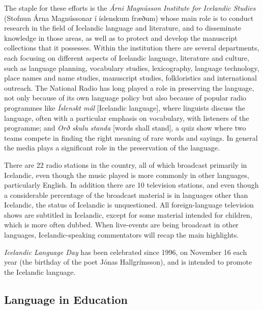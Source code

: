\documentclass{../../metanetpaper}
\begin{document}
\begin{multicols}{2}
The staple for these efforts is the \textit{Árni Magnússon Institute for Icelandic Studies} (Stofnun Árna Magnússonar í íslenskum fræðum) whose main role is to conduct research in the field of Icelandic language and literature, and to disseminate knowledge in those areas, as well as to protect and develop the manuscript collections that it possesses\cite{alt2}.  Within the institution there are several departments, each focusing on different aspects of Icelandic language, literature and culture, such as language planning, vocabulary studies, lexicography, language technology, place names and name studies, manuscript studies, folkloristics and international outreach.
The National Radio has long played a role in preserving the language, not only because of its own language policy but also because of popular radio programmes like \textit{Íslenskt mál} {[}Icelandic language{]}, where linguists discuss the language, often with a particular emphasis on vocabulary, with listeners of the programme; and \textit{Orð skulu standa} {[}words shall stand{]}, a quiz show where two teams compete in finding the right meaning of rare words and sayings. In general the media plays a significant role in the preservation of the language.

There are 22 radio stations in the country, all of which broadcast primarily in Icelandic, even though the music played is more commonly in other languages, particularly English. In addition there are 10 television stations, and even though a considerable percentage of the broadcast material is in languages other than Icelandic, the status of Icelandic is unquestioned\cite{hag2}.  All foreign-language television shows are subtitled in Icelandic, except for some material intended for children, which is more often dubbed. When live-events are being broadcast in other languages, Icelandic-speaking commentators will recap the main highlights\cite{alt3}. 

\textit{Icelandic Language Day} has been celebrated since 1996, on November 16 each year (the birthday of the poet Jónas Hallgrímsson), and is intended to promote the Icelandic language\cite{men1}.

\subsection{Language in Education}


\end{multicols}
\end{document}
